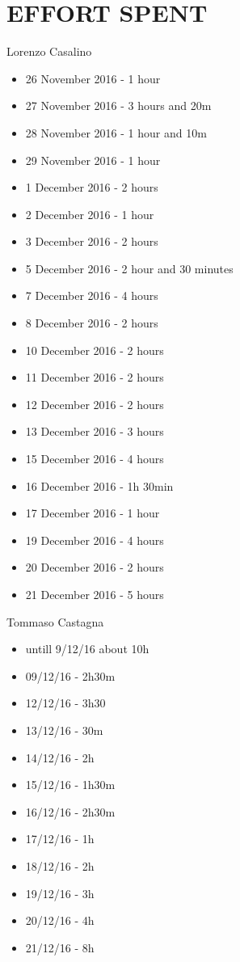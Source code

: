 \section{EFFORT SPENT}

	Lorenzo Casalino

	\begin{itemize}
		\item 26 November 2016 - 1 hour
		\item 27 November 2016 - 3 hours and 20m
		\item 28 November 2016 - 1 hour and 10m
		\item 29 November 2016 - 1 hour
		\item 1  December 2016 - 2 hours
		\item 2  December 2016 - 1 hour
		\item 3  December 2016 - 2 hours
		\item 5  December 2016 - 2 hour and 30 minutes
		\item 7  December 2016 - 4 hours
		\item 8  December 2016 - 2 hours
		\item 10 December 2016 - 2 hours
		\item 11 December 2016 - 2 hours
		\item 12 December 2016 - 2 hours
		\item 13 December 2016 - 3 hours
		\item 15 December 2016 - 4 hours
		\item 16 December 2016 - 1h 30min
		\item 17 December 2016 - 1 hour
		\item 19 December 2016 - 4 hours
		\item 20 December 2016 - 2 hours
		\item 21 December 2016 - 5 hours
	\end{itemize}

	Tommaso Castagna

	\begin{itemize}
		\item untill 9/12/16 about 10h
		\item 09/12/16 - 2h30m
		\item 12/12/16 - 3h30
		\item 13/12/16 - 30m
		\item 14/12/16 - 2h
		\item 15/12/16 - 1h30m
		\item 16/12/16 - 2h30m
		\item 17/12/16 - 1h
		\item 18/12/16 - 2h
		\item 19/12/16 - 3h
		\item 20/12/16 - 4h
		\item 21/12/16 - 8h
	\end{itemize}
